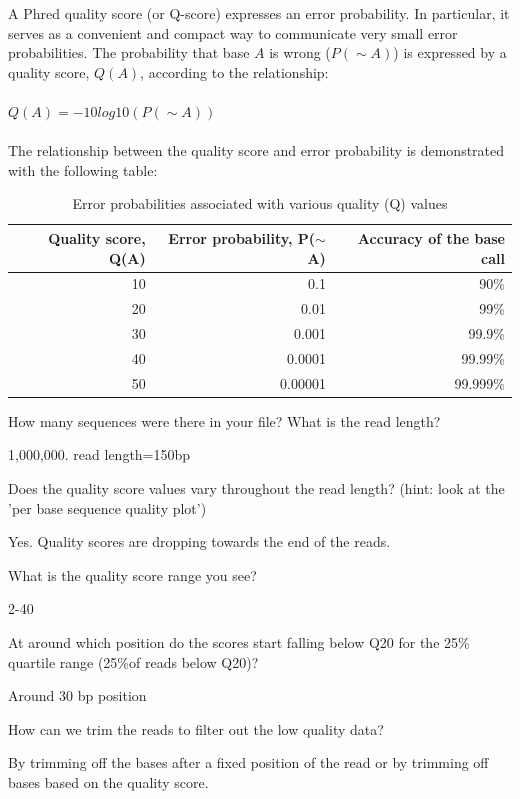 \begin{information}
A Phred quality score (or Q-score) expresses an error probability.  In particular, it
serves as a convenient and compact way to communicate very small error
probabilities.
The probability that base $A$ is wrong ($P(\sim A)$) is expressed
by a quality score, $Q(A)$, according to the relationship:
\\\\
$Q(A) =-10 log10(P(\sim A))$
\\\\
The relationship between the quality score and error probability is demonstrated
with the following table:

\begin{table}[H]
  \centering
  \caption{Error probabilities associated with various quality (Q) values}
    \begin{tabular}{rrr}
    \toprule
    \textbf{Quality score, Q(A)} & \textbf{Error probability, P($\sim$A)} & \textbf{Accuracy of the base call} \\
    \midrule
    10    & 0.1     & 90\% \\
    20    & 0.01    & 99\% \\
    30    & 0.001   & 99.9\% \\
    40    & 0.0001  & 99.99\% \\
    50    & 0.00001 & 99.999\% \\
    \bottomrule
    \end{tabular}
  \label{tab:quality_error_probs}
\end{table}

\end{information}

\begin{questions}
How many sequences were there in your file? What is the read length?
\begin{answer}
1,000,000. read length=150bp
\end{answer}

Does the quality score values vary throughout the read length?
(hint: look at the 'per base sequence quality plot')
\begin{answer}
Yes. Quality scores are dropping towards the end of the reads.
\end{answer}

What is the quality score range you see?
\begin{answer}
2-40
\end{answer}

At around which position do the scores start falling below Q20 for the 25\% quartile range (25\%of reads below Q20)? 
\begin{answer}
Around 30 bp position
\end{answer}

How can we trim the reads to filter out the low quality data?
\begin{answer}
By trimming off the bases after a fixed position of the read or by trimming off
bases based on the quality score.
\end{answer}
\end{questions}

